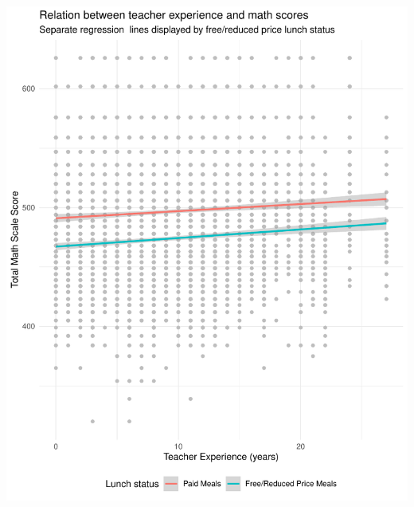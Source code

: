\documentclass[man]{apa6}
\begin{document}
\includegraphics{lab_8a_files/figure-latex/create_graph-1.pdf}
\end{document}
